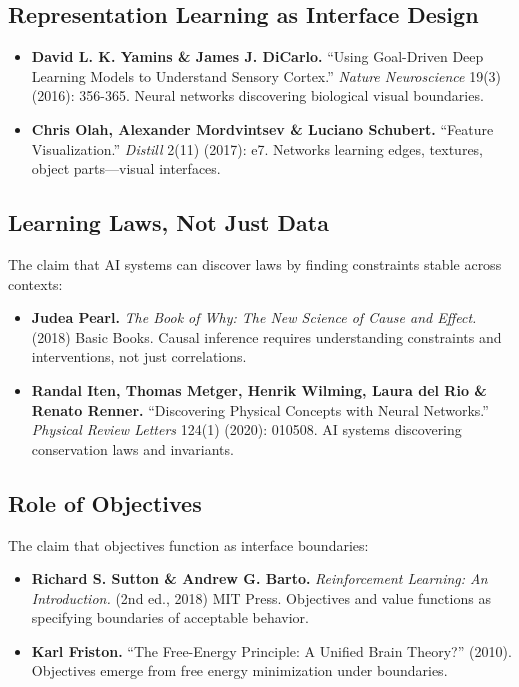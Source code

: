 \documentclass[
  openright]{book}
\begin{document}
\subsection{Representation Learning as Interface
Design}\label{representation-learning-as-interface-design-1}

\begin{itemize}
\item
  \textbf{David L. K. Yamins \& James J. DiCarlo.} ``Using Goal-Driven
  Deep Learning Models to Understand Sensory Cortex.'' \emph{Nature
  Neuroscience} 19(3) (2016): 356-365. Neural networks discovering
  biological visual boundaries.
\item
  \textbf{Chris Olah, Alexander Mordvintsev \& Luciano Schubert.}
  ``Feature Visualization.'' \emph{Distill} 2(11) (2017): e7. Networks
  learning edges, textures, object parts---visual interfaces.
\end{itemize}

\subsection{Learning Laws, Not Just
Data}\label{learning-laws-not-just-data-1}

The claim that AI systems can discover laws by finding constraints
stable across contexts:

\begin{itemize}
\item
  \textbf{Judea Pearl.} \emph{The Book of Why: The New Science of Cause
  and Effect.} (2018) Basic Books. Causal inference requires
  understanding constraints and interventions, not just correlations.
\item
  \textbf{Randal Iten, Thomas Metger, Henrik Wilming, Laura del Rio \&
  Renato Renner.} ``Discovering Physical Concepts with Neural
  Networks.'' \emph{Physical Review Letters} 124(1) (2020): 010508. AI
  systems discovering conservation laws and invariants.
\end{itemize}

\subsection{Role of Objectives}\label{role-of-objectives}

The claim that objectives function as interface boundaries:

\begin{itemize}
\item
  \textbf{Richard S. Sutton \& Andrew G. Barto.} \emph{Reinforcement
  Learning: An Introduction.} (2nd ed., 2018) MIT Press. Objectives and
  value functions as specifying boundaries of acceptable behavior.
\item
  \textbf{Karl Friston.} ``The Free-Energy Principle: A Unified Brain
  Theory?'' (2010). Objectives emerge from free energy minimization
  under boundaries.
\end{itemize}
\end{document}
